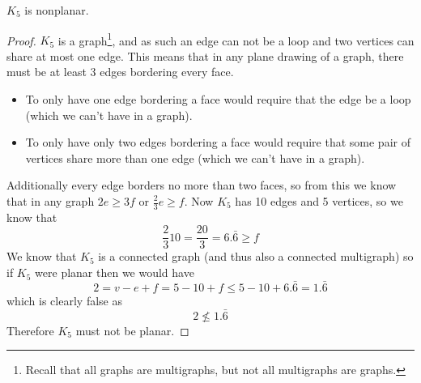\documentclass{article}
\begin{document}
\begin{theorem} \label{k5}
	$K_5$ is nonplanar.
\end{theorem}
\begin{center}

	\scalebox{.9}{$K_5$}
\end{center}
\begin{proof}
	$K_5$ is a graph\footnote{Recall that all graphs are multigraphs, but not all multigraphs are graphs.}, and as such an edge can not be a loop and two vertices can share at most one edge. This means that in any plane drawing of a graph, there must be at least 3 edges bordering every face.
	\begin{itemize}
		\item To only have one edge bordering a face would require that the edge be a loop (which we can't have in a graph).
		\item To only have only two edges bordering a face would require that some pair of vertices share more than one edge (which we can't have in a graph).
	\end{itemize}
	Additionally every edge borders no more than two faces, so from this we know that in any graph $2e \ge 3f$ or $\frac23e\ge f$. Now $K_5$ has 10 edges and 5 vertices, so we know that $$\frac2310=\frac{20}3=6.\bar6\ge f$$ We know that $K_5$ is a connected graph (and thus also a connected multigraph) so if $K_5$ were planar then we would have $$2=v-e+f=5-10+f\le5-10+6.\bar6 = 1.\bar6$$ which is clearly false as $$2\not\le1.\bar6$$ Therefore $K_5$ must not be planar.
\end{proof}
\end{document}
